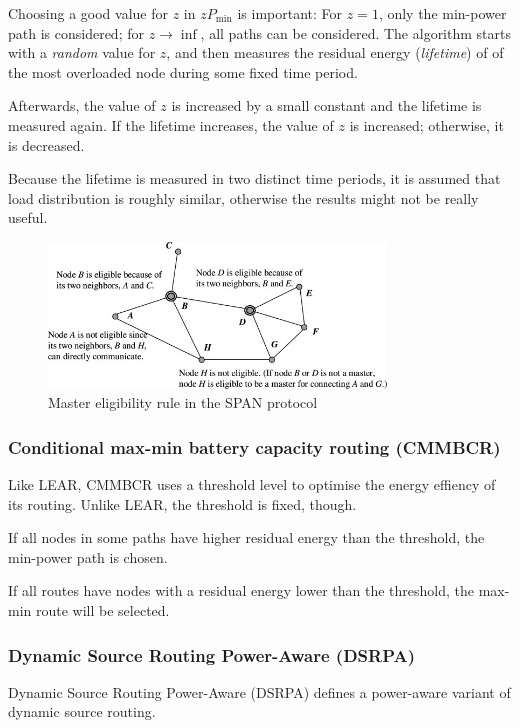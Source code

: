 Choosing a good value for $z$ in $zP_{\min}$ is important: For $z=1$, only
the min-power path is considered; for $z \to \inf$, all paths can be
considered. The algorithm starts with a \textit{random} value for $z$, and
then measures the residual energy (\textit{lifetime}) of of the most overloaded node during some
fixed time period.

 Afterwards, the value of $z$ is increased by a small constant
 and the lifetime is measured again. If the lifetime increases, the value of $z$
is increased; otherwise, it is decreased.

Because the lifetime is measured
in two distinct time periods, it is assumed that load distribution is roughly
similar, otherwise the results might not be really useful.
\begin{figure}
\centering
\includegraphics[width=0.8\textwidth]{images/span-master-example}
\caption{Master eligibility rule in the SPAN protocol\cite{alotaibi2012survey}}
\label{spanmaster}
\end{figure}
\subsubsection{Conditional max-min battery capacity routing (CMMBCR)}
Like LEAR, CMMBCR\cite{toh2001maximum} uses a threshold level to optimise
the energy effiency of its routing.
Unlike LEAR, the threshold is fixed, though.

If all nodes in some paths have higher residual energy than the threshold,
the min-power path is chosen.

If all routes have nodes with a residual energy lower than the threshold, the
max-min route will be selected.

\subsubsection{Dynamic Source Routing Power-Aware (DSRPA)}
\label{dsrpa}
Dynamic Source Routing Power-Aware (DSRPA)\cite{djenouri2006new} defines a
power-aware variant of dynamic source routing.

